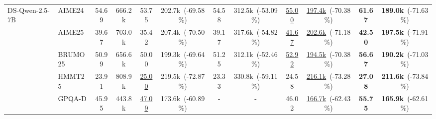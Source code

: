 \documentclass[11pt]{article}
\theoremstyle{plain}
\begin{document}
\begin{table}[ht!]
{\begin{tabular}{llcc cc cc cc cc}
\midrule
\multirow{5}{*}{DS-Qwen-2.5-7B} 
& AIME24    & \cellcolor{mygreen2}54.69 & 666.2k  & \cellcolor{mygreen1}53.75 & 202.7k~(-69.58\%)  & \cellcolor{mygreen2}54.58 & 312.5k~(-53.09\%) & \cellcolor{mygreen2}\underline{55.00} & \underline{197.4k}~(-70.38\%)    & \cellcolor{mygreen3}\textbf{61.67} & \textbf{189.0k}~(-71.63\%) \\
& AIME25    & \cellcolor{mygreen2}39.67 & 703.0k  & \cellcolor{mygreen1}35.42 & 207.4k~(-70.50\%)  & \cellcolor{mygreen2}39.17 & 317.6k~(-54.82\%) & \cellcolor{mygreen2}\underline{41.67} & \underline{202.6k}~(-71.18\%)    & \cellcolor{mygreen3}\textbf{42.50} & \textbf{197.5k}~(-71.91\%) \\
& BRUMO25   & \cellcolor{mygreen2}50.99 & 656.6k  & \cellcolor{mygreen1}50.00 & 199.3k~(-69.64\%)  & \cellcolor{mygreen2}51.25 & 312.1k~(-52.46\%) & \cellcolor{mygreen2}\underline{52.92} & \underline{194.5k}~(-70.38\%)    & \cellcolor{mygreen3}\textbf{56.67} & \textbf{190.2k}~(-71.03\%)\\
& HMMT25    & \cellcolor{mygreen1}23.91 & 808.9k  & \cellcolor{mygreen2}\underline{25.00} & 219.5k~(-72.87\%)  & \cellcolor{mygreen1}23.33 & 330.8k~(-59.11\%) & \cellcolor{mygreen2}24.58 & \underline{216.1k}~(-73.28\%)    & \cellcolor{mygreen3}\textbf{27.08} & \textbf{211.6k}~(-73.84\%)\\
& GPQA-D    & \cellcolor{mygreen1}45.95 & 443.8k  & \cellcolor{mygreen2}\underline{47.09} & 173.6k~(-60.89\%)  & - & - & \cellcolor{mygreen2}46.02 & \underline{166.7k}~(-62.43\%)    & \cellcolor{mygreen3}\textbf{55.75} & \textbf{165.9k}~(-62.61\%)\\


\end{tabular}}
\end{table}
\end{document}
